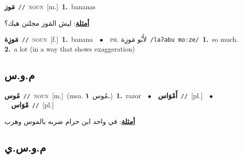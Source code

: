 \documentclass[10pt,a4paper,twoside]{article} %
\begin{document}
\begin{multicols}{2}
{\setlength\topsep{0pt}\textbf{\foreignlanguage{arabic}{مَوز}}\ {\color{gray}\texttt{//}\color{black}}\ \textsc{noun}\ [m.]\ \textbf{1.}~bananas\  \begin{flushright}\color{gray}\foreignlanguage{arabic}{\textbf{\underline{\foreignlanguage{arabic}{أمثلة}}}: ليش المَوز مجلتن هيك؟}\end{flushright}\color{black}} \vspace{2mm}

{\setlength\topsep{0pt}\textbf{\foreignlanguage{arabic}{مَوزِة}}\ {\color{gray}\texttt{//}\color{black}}\ \textsc{noun}\ [f.]\ \textbf{1.}~banana\ \ $\bullet$\ \ \textsc{ph.} \color{gray} \foreignlanguage{arabic}{لأَبُو مَوزِة}\color{black}\ {\color{gray}\texttt{/{\sffamily laʔabu moːze}/}\color{black}}\ \textbf{1.}~so much.  \textbf{2.}~a lot (in a way that shows exaggeration)\ } \vspace{2mm}

\vspace{-3mm}
\subsection*{\color{blue}\foreignlanguage{arabic}{م.و.س}\color{blue}{}} 

{\setlength\topsep{0pt}\textbf{\foreignlanguage{arabic}{مُوس}}\ {\color{gray}\texttt{//}\color{black}}\ \textsc{noun}\ [m.]\ \color{gray}(msa. \foreignlanguage{arabic}{مُوس}~\foreignlanguage{arabic}{\textbf{١.}})\color{black}\ \textbf{1.}~razor\ \ $\bullet$\ \ \setlength\topsep{0pt}\textbf{\foreignlanguage{arabic}{أَمْوَاس}}\ {\color{gray}\texttt{//}\color{black}}\ [pl.]\ \ $\bullet$\ \ \setlength\topsep{0pt}\textbf{\foreignlanguage{arabic}{مْوَاس}}\ {\color{gray}\texttt{//}\color{black}}\ [pl.]\  \begin{flushright}\color{gray}\foreignlanguage{arabic}{\textbf{\underline{\foreignlanguage{arabic}{أمثلة}}}: في واحد ابن حرام ضربه بالموس وهرب}\end{flushright}\color{black}} \vspace{2mm}

\vspace{-3mm}
\subsection*{\color{blue}\foreignlanguage{arabic}{م.و.س.ي}\color{blue}{}} 


\end{multicols}
\end{document}
